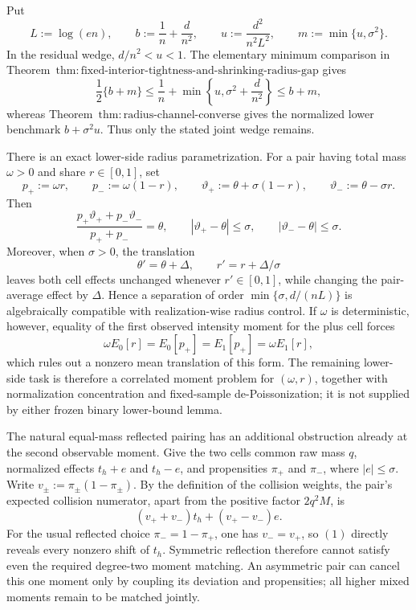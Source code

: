 Put
\[
 L:=\log(en),\qquad b:=\frac1n+\frac d{n^2},\qquad
 u:=\frac{d^2}{n^2L^2},\qquad m:=\min\{u,\sigma^2\}.
\]
In the residual wedge, \(d/n^2<u<1\).  The elementary minimum comparison in Theorem~\(\mathrm{thm:fixed\text{-}interior\text{-}tightness\text{-}and\text{-}shrinking\text{-}radius\text{-}gap}\) gives
\[
 \frac12\{b+m\}
 \le \frac1n+\min\left\{u,\sigma^2+\frac d{n^2}\right\}
 \le b+m,
\]
whereas Theorem~\(\mathrm{thm:radius\text{-}channel\text{-}converse}\) gives the normalized lower benchmark \(b+\sigma^2u\).  Thus only the stated joint wedge remains.

There is an exact lower-side radius parametrization.  For a pair having total mass \(\omega>0\) and share \(r\in[0,1]\), set
\[
 p_+:=\omega r,\qquad p_-:=\omega(1-r),
 \qquad
 \vartheta_+:=\theta+\sigma(1-r),\qquad
 \vartheta_-:=\theta-\sigma r.
\]
Then
\[
 \frac{p_+\vartheta_++p_-\vartheta_-}{p_++p_-}=\theta,
 \qquad
 |\vartheta_+-\theta|\le\sigma,\qquad
 |\vartheta_--\theta|\le\sigma.
\]
Moreover, when \(\sigma>0\), the translation
\[
 \theta'=\theta+\Delta,\qquad r'=r+\Delta/\sigma
\]
leaves both cell effects unchanged whenever \(r'\in[0,1]\), while changing the pair-average effect by \(\Delta\).  Hence a separation of order \(\min\{\sigma,d/(nL)\}\) is algebraically compatible with realization-wise radius control.  If \(\omega\) is deterministic, however, equality of the first observed intensity moment for the plus cell forces
\[
 \omega E_0[r]=E_0[p_+]=E_1[p_+]=\omega E_1[r],
\]
which rules out a nonzero mean translation of this form.  The remaining lower-side task is therefore a correlated moment problem for \((\omega,r)\), together with normalization concentration and fixed-sample de-Poissonization; it is not supplied by either frozen binary lower-bound lemma.

The natural equal-mass reflected pairing has an additional obstruction already at the second observable moment.  Give the two cells common raw mass \(q\), normalized effects \(t_h+e\) and \(t_h-e\), and propensities \(\pi_+\) and \(\pi_-\), where \(|e|\le\sigma\).  Write \(v_\pm:=\pi_\pm(1-\pi_\pm)\).  By the definition of the collision weights, the pair's expected collision numerator, apart from the positive factor \(2q^2M\), is
\[
 (v_++v_-)t_h+(v_+-v_-)e.
\tag{1}
\]
For the usual reflected choice \(\pi_-=1-\pi_+\), one has \(v_-=v_+\), so \((1)\) directly reveals every nonzero shift of \(t_h\).  Symmetric reflection therefore cannot satisfy even the required degree-two moment matching.  An asymmetric pair can cancel this one moment only by coupling its deviation and propensities; all higher mixed moments remain to be matched jointly.

